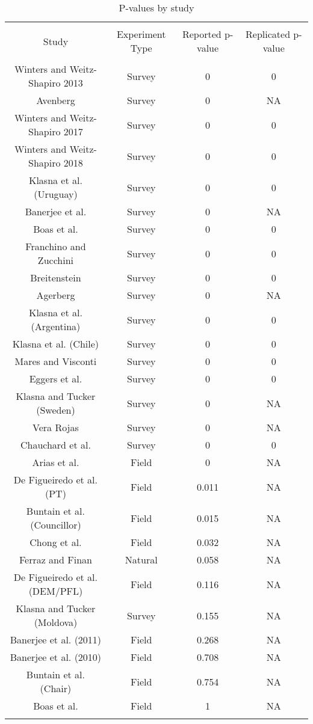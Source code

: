 
\begin{table}[!htbp] \centering 
  \caption{P-values by study} 
  \label{p_study} 
\begin{tabular}{@{\extracolsep{5pt}} cccc} 
\\[-1.8ex]\hline 
\hline \\[-1.8ex] 
Study & Experiment Type & Reported p-value & Replicated p-value \\ 
\hline \\[-1.8ex] 
Winters and Weitz-Shapiro 2013 & Survey & 0 & 0 \\ 
Avenberg & Survey & 0 & NA \\ 
Winters and Weitz-Shapiro 2017 & Survey & 0 & 0 \\ 
Winters and Weitz-Shapiro 2018 & Survey & 0 & 0 \\ 
Klasna et al. (Uruguay) & Survey & 0 & 0 \\ 
Banerjee et al. & Survey & 0 & NA \\ 
Boas et al. & Survey & 0 & 0 \\ 
Franchino and Zucchini & Survey & 0 & 0 \\ 
Breitenstein & Survey & 0 & 0 \\ 
Agerberg & Survey & 0 & NA \\ 
Klasna et al. (Argentina) & Survey & 0 & 0 \\ 
Klasna et al. (Chile) & Survey & 0 & 0 \\ 
Mares and Visconti & Survey & 0 & 0 \\ 
Eggers et al. & Survey & 0 & 0 \\ 
Klasna and Tucker (Sweden) & Survey & 0 & NA \\ 
Vera Rojas & Survey & 0 & NA \\ 
Chauchard et al. & Survey & 0 & 0 \\ 
Arias et al. & Field & 0 & NA \\ 
De Figueiredo et al. (PT) & Field & 0.011 & NA \\ 
Buntain et al. (Councillor) & Field & 0.015 & NA \\ 
Chong et al. & Field & 0.032 & NA \\ 
Ferraz and Finan & Natural & 0.058 & NA \\ 
De Figueiredo et al. (DEM/PFL) & Field & 0.116 & NA \\ 
Klasna and Tucker (Moldova) & Survey & 0.155 & NA \\ 
Banerjee et al. (2011) & Field & 0.268 & NA \\ 
Banerjee et al. (2010) & Field & 0.708 & NA \\ 
Buntain et al. (Chair) & Field & 0.754 & NA \\ 
Boas et al. & Field & 1 & NA \\ 
\hline \\[-1.8ex] 
\end{tabular} 
\end{table} 
